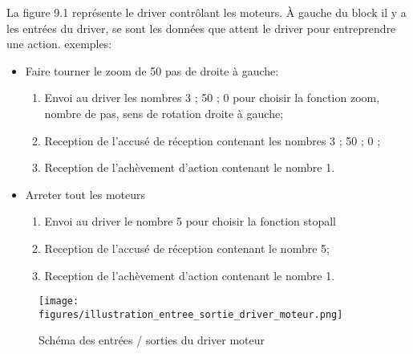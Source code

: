 La figure 9.1 représente le driver contrôlant les moteurs. À gauche du block il y a les entrées du driver, se sont les données que attent le driver pour entreprendre une action.  exemples: 
\begin{itemize}
	\item Faire tourner le zoom de 50 pas de droite à gauche:
	\begin{enumerate}
		\item Envoi au driver les nombres 3 ; 50 ; 0 pour choisir la fonction zoom, nombre de pas, sens de rotation droite à gauche;
		\item Reception de l'accusé de réception contenant les nombres 3 ; 50 ; 0 ;
		\item Reception de l'achèvement d'action contenant le nombre 1.
	\end{enumerate}
	\item Arreter tout les moteurs
	\begin{enumerate}
		\item Envoi au driver le nombre 5 pour choisir la fonction stopall
		\item Reception de l'accusé de réception contenant le nombre 5;
		\item Reception de l'achèvement d'action contenant le nombre 1.
	\end{enumerate}
\end{itemize}

\begin{figure}[H]
    \centering
    \texttt{[image: \\figures/illustration\_entree\_sortie\_driver\_moteur.png]}
    \decoRule
    \caption[
    Schéma des entrées / sorties du driver moteur]{
    Schéma des entrées / sorties du driver moteur}
    \label{fig:Schéma des entrées / sorties du driver moteur}
    \end{figure}

